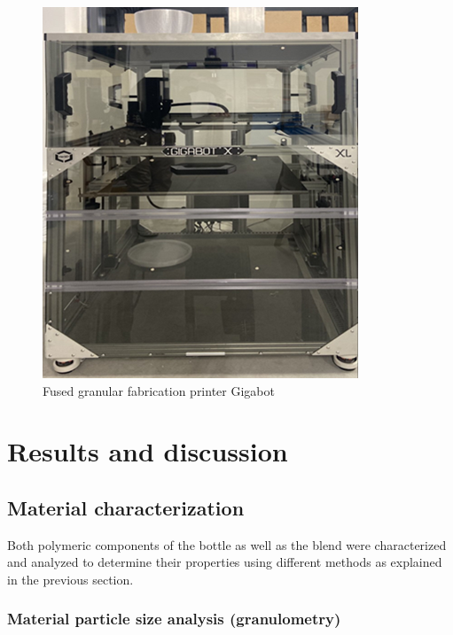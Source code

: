 \documentclass[
  12pt,
]{article}
\begin{document}
\begin{figure}

{\centering \includegraphics{figures/Figure_4_Giga.png}

}

\caption{\label{fig-gigabot}Fused granular fabrication printer Gigabot}

\end{figure}

\hypertarget{results-and-discussion}{%
\section{Results and discussion}\label{results-and-discussion}}

\hypertarget{material-characterization}{%
\subsection{Material characterization}\label{material-characterization}}

Both polymeric components of the bottle as well as the blend were
characterized and analyzed to determine their properties using different
methods as explained in the previous section.

\hypertarget{material-particle-size-analysis-granulometry}{%
\subsubsection{Material particle size analysis
(granulometry)}\label{material-particle-size-analysis-granulometry}}
\end{document}
